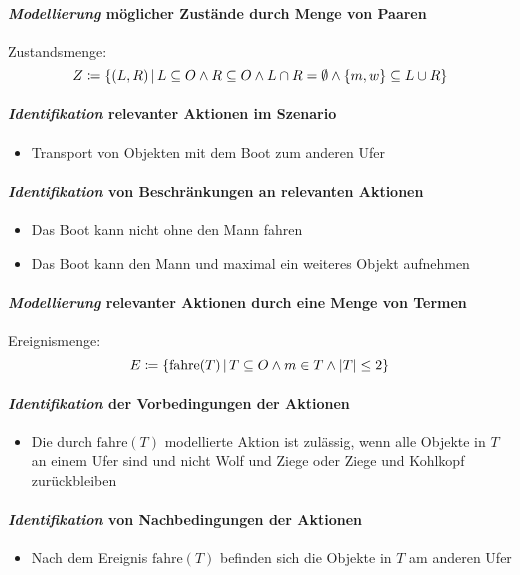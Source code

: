 		\paragraph{\textit{Modellierung} möglicher Zustände durch Menge von Paaren}
			Zustandsmenge:
			\[ Z \coloneqq \{ (L, R) \,\vert\, L \subseteq O \land R \subseteq O \land L \cap R = \emptyset \land \{ m, w \} \subseteq L \cup R \} \]

		\paragraph{\textit{Identifikation} relevanter Aktionen im Szenario}
			\begin{itemize}
				\item Transport von Objekten mit dem Boot zum anderen Ufer
			\end{itemize}

		\paragraph{\textit{Identifikation} von Beschränkungen an relevanten Aktionen}
			\begin{itemize}
				\item Das Boot kann nicht ohne den Mann fahren
				\item Das Boot kann den Mann und maximal ein weiteres Objekt aufnehmen
			\end{itemize}

		\paragraph{\textit{Modellierung} relevanter Aktionen durch eine Menge von Termen}
			Ereignismenge:
			\[ E \coloneqq \{ \text{fahre}(T) \,\vert\, T \subseteq O \land m \in T \land \abs{T} \leq 2 \} \]

		\paragraph{\textit{Identifikation} der Vorbedingungen der Aktionen}
			\begin{itemize}
				\item Die durch $ \text{fahre}(T) $ modellierte Aktion ist zulässig, wenn alle Objekte in $ T $ an einem Ufer sind und nicht Wolf und Ziege oder Ziege und Kohlkopf zurückbleiben
			\end{itemize}

		\paragraph{\textit{Identifikation} von Nachbedingungen der Aktionen}
			\begin{itemize}
				\item Nach dem Ereignis $ \text{fahre}(T) $ befinden sich die Objekte in $ T $ am anderen Ufer
			\end{itemize}

